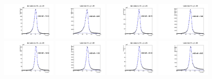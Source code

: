 \documentclass[thesis.tex]{subfiles}
\renewcommand\_{\textunderscore\allowbreak}
\begin{document}
\begin{figure}
  \centering
   \includegraphics[width=0.24\textwidth]{Figures/Bw_ker_pt_den_35_40.pdf}  \includegraphics[width=0.24\textwidth]{Figures/Bw_ker_pt_num_35_40.pdf}   \includegraphics[width=0.24\textwidth]{Figures/Bw_ker_pt_den_40_45.pdf} \includegraphics[width=0.24\textwidth]{Figures/Bw_ker_pt_num_40_45.pdf} \\
   \includegraphics[width=0.24\textwidth]{Figures/Bw_ker_pt_den_45_50.pdf}  \includegraphics[width=0.24\textwidth]{Figures/Bw_ker_pt_num_45_50.pdf}   \includegraphics[width=0.24\textwidth]{Figures/Bw_ker_pt_den_50_55.pdf} \includegraphics[width=0.24\textwidth]{Figures/Bw_ker_pt_num_50_55.pdf} \\

\end{figure}
\end{document}
